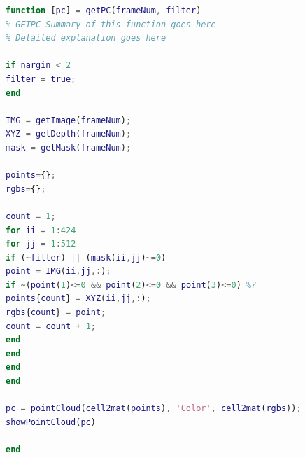 \documentclass[10pt,a4paper]{article}
\begin{document}
\begin{lstlisting}[language=matlab]
%%
function [pc] = getPC(frameNum, filter)
% GETPC Summary of this function goes here
% Detailed explanation goes here

if nargin < 2 
filter = true;
end    

IMG = getImage(frameNum);
XYZ = getDepth(frameNum);
mask = getMask(frameNum);

points={};
rgbs={};

count = 1;
for ii = 1:424
for jj = 1:512
if (~filter) || (mask(ii,jj)~=0)
point = IMG(ii,jj,:);
if ~(point(1)<=0 && point(2)<=0 && point(3)<=0) %?
points{count} = XYZ(ii,jj,:);
rgbs{count} = point;
count = count + 1;
end
end
end
end

pc = pointCloud(cell2mat(points), 'Color', cell2mat(rgbs));
showPointCloud(pc)

end
\end{lstlisting}
\end{document}
